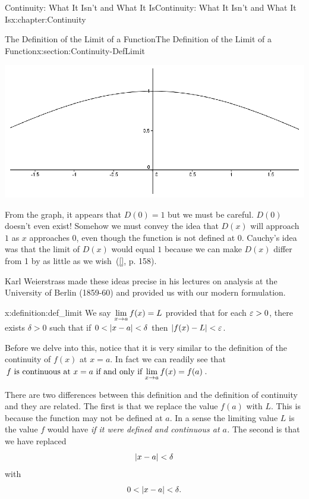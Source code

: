 \begin{chapterptx}{Continuity: What It Isn't and What It Is}{}{Continuity: What It Isn't and What It Is}{}{}{x:chapter:Continuity}
\begin{sectionptx}{The Definition of the Limit of a Function}{}{The Definition of the Limit of a Function}{}{}{x:section:Continuity-DefLimit}
\begin{image}{0.22}{0.56}{0.22}
			\includegraphics[width=\linewidth]{external/images/SinGraph.png}
		\end{image}%
		From the graph, it appears that \(D(0) =1\) but we must be careful.  \(D(0)\) doesn't even exist!  Somehow we must convey the idea that \(D(x)\) will approach \(1\) as \(x\) approaches \(0\), even though the function is not defined at \(0\).  Cauchy's idea was that the limit of \(D(x)\) would equal \(1\) because we can make \(D(x)\) differ from 1 by as little as we wish~(\hyperlink{x:biblio:jahnke03__histor_analy}{[{}]}, p. 158).%
		\par
		Karl Weierstrass  made these ideas precise in his lectures on analysis at the University of Berlin (1859-60) and provided us with our modern formulation.%
		\begin{definition}{}{x:definition:def_limit}%
			 We say \({\displaystyle\lim_{x\rightarrow a}f(x)} =L\) provided that for each \(\varepsilon>0\), there exists \(\delta>0\) such that if \(0< \left|x-a\right|< \delta\) then \(\left|f(x)-L\right|< \varepsilon\).%
		\end{definition}
		Before we delve into this, notice that it is very similar to the definition of the continuity of \(f(x)\) at \(x=a\). In fact we can readily see that \(f \text{ is continuous at } x=a \text{ if and only if } {\displaystyle\lim_{x\rightarrow a}f(x)} = f(a)\).%
		\par
		There are two differences between this definition and the definition of continuity and they are related.  The first is that we replace the value \(f(a)\) with \(L\).  This is because the function may not be defined at \(a\).  In a sense the limiting value \(L\) is the value \(f\) would have \emph{if it were defined and continuous at \(a\).} The second is that we have replaced%
		\begin{equation*}
			\left|x-a\right|< \delta
		\end{equation*}
		with%
		\begin{equation*}
			0\lt \abs{x-a}\lt \delta\text{.}

\end{equation*}
\end{sectionptx}
\end{chapterptx}
